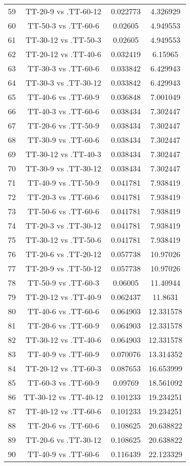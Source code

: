 \documentclass[a4paper,10pt]{article}
\begin{document}
\begin{landscape}
\begin{table}[!htp]
\begin{tabular}{cccc}
59&TT-20-9 vs .TT-60-12&0.022773&4.326929\\
60&TT-50-3 vs .TT-60-6&0.02605&4.949553\\
61&TT-30-12 vs .TT-50-3&0.02605&4.949553\\
62&TT-20-12 vs .TT-40-6&0.032419&6.15965\\
63&TT-30-3 vs .TT-60-6&0.033842&6.429943\\
64&TT-30-3 vs .TT-30-12&0.033842&6.429943\\
65&TT-40-6 vs .TT-60-9&0.036848&7.001049\\
66&TT-40-3 vs .TT-60-6&0.038434&7.302447\\
67&TT-20-6 vs .TT-50-9&0.038434&7.302447\\
68&TT-30-9 vs .TT-60-6&0.038434&7.302447\\
69&TT-30-12 vs .TT-40-3&0.038434&7.302447\\
70&TT-30-9 vs .TT-30-12&0.038434&7.302447\\
71&TT-40-9 vs .TT-50-9&0.041781&7.938419\\
72&TT-20-3 vs .TT-60-6&0.041781&7.938419\\
73&TT-50-6 vs .TT-60-6&0.041781&7.938419\\
74&TT-20-3 vs .TT-30-12&0.041781&7.938419\\
75&TT-30-12 vs .TT-50-6&0.041781&7.938419\\
76&TT-20-6 vs .TT-20-12&0.057738&10.97026\\
77&TT-20-9 vs .TT-50-12&0.057738&10.97026\\
78&TT-50-9 vs .TT-60-3&0.06005&11.40944\\
79&TT-20-12 vs .TT-40-9&0.062437&11.8631\\
80&TT-40-6 vs .TT-60-6&0.064903&12.331578\\
81&TT-20-6 vs .TT-60-9&0.064903&12.331578\\
82&TT-30-12 vs .TT-40-6&0.064903&12.331578\\
83&TT-40-9 vs .TT-60-9&0.070076&13.314352\\
84&TT-20-12 vs .TT-60-3&0.087653&16.653999\\
85&TT-60-3 vs .TT-60-9&0.09769&18.561092\\
86&TT-30-12 vs .TT-40-12&0.101233&19.234251\\
87&TT-40-12 vs .TT-60-6&0.101233&19.234251\\
88&TT-20-6 vs .TT-60-6&0.108625&20.638822\\
89&TT-20-6 vs .TT-30-12&0.108625&20.638822\\
90&TT-40-9 vs .TT-60-6&0.116439&22.123329\\

\end{tabular}
\end{table}
\end{landscape}
\end{document}
